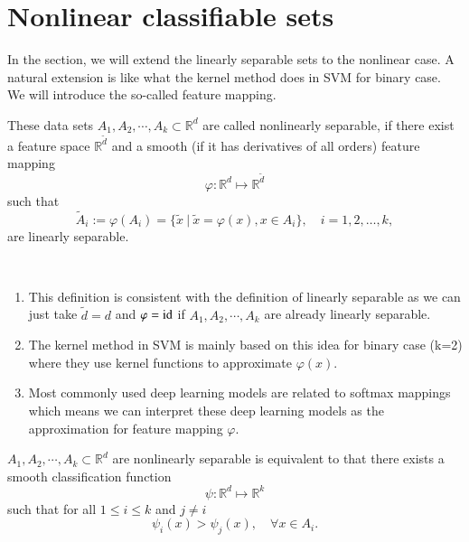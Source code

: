 \section{Nonlinear classifiable sets}
In the section, we will extend the linearly separable sets to the nonlinear case. 
A natural extension is like what the kernel method does in SVM for binary case. We will introduce the so-called 
feature mapping.


\begin{definition}
	These data sets $A_1, A_2, \cdots, A_k \subset \mathbb{R}^d$ are called nonlinearly separable, if there exist
	a feature space $\mathbb{R}^{\tilde d}$ and a smooth (if it has derivatives of all orders) feature mapping 
	\begin{equation}\label{key}
	\varphi: \mathbb{R}^d \mapsto \mathbb{R}^{\tilde d}
	\end{equation}
	such that
	\begin{equation}\label{key}
	\tilde A_i := \varphi(A_i) = \{ \tilde x ~|~ \tilde x = \varphi(x), x \in A_i \}, \quad i = 1, 2, \dots, k,
	\end{equation}
	are linearly separable.
\end{definition}

\begin{remark}$ $\\
	\begin{enumerate}
		\item This definition is  consistent with the definition of linearly separable as we can just take $\tilde d = d$ and $\varphi = {\rm id}$ if $A_1, A_2, \cdots, A_k$ are already linearly separable.
		\item The kernel method in SVM is mainly based on this idea for binary case (k=2) where they use kernel functions to approximate $\varphi(x)$.
		\item Most commonly used deep learning models are related to softmax mappings which means we can interpret these deep learning models as the approximation for feature mapping $\varphi$.
	\end{enumerate}	
\end{remark}


\begin{theorem}
	$A_1, A_2, \cdots, A_k \subset \mathbb{R}^d$ are nonlinearly separable  is equivalent to that there  
	 exists a smooth classification function 
	\begin{equation}\label{key}
	\psi: \mathbb{R}^d \mapsto \mathbb{R}^{k}
	\end{equation}
	such that for all $1\leq i \leq k$ and $ j \neq i$
	\begin{equation}\label{key}
	\psi_i (x) > \psi_j (x), \quad \forall x \in A_i.
	\end{equation}
\end{theorem}

